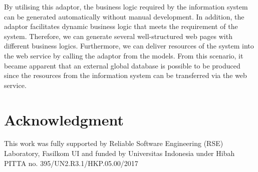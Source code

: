 \documentclass[conference]{IEEEtran}
\begin{document}
By utilising this adaptor, the business logic required by the information system can be generated automatically without manual development. In addition, the adaptor facilitates dynamic business logic that meets the requirement of the system. Therefore, we can generate several well-structured web pages with different business logics. Furthermore, we can deliver resources of the system into the web service by calling the adaptor from the models. From this scenario, it became apparent that an external global database is possible to be produced since the resources from the information system can be transferred via the web service.

\section*{Acknowledgment}
This work was fully supported by Reliable Software Engineering (RSE) Laboratory, Fasilkom UI and funded by Universitas Indonesia under Hibah PITTA no. 395/UN2.R3.1/HKP.05.00/2017




\end{document}
